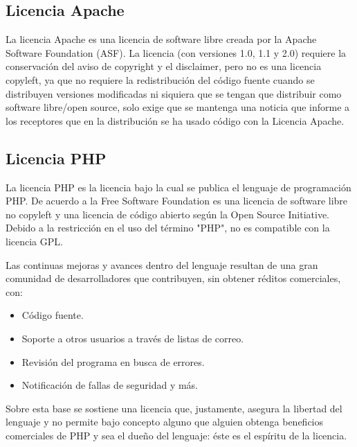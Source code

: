 			\subsection{Licencia Apache}\label{apsl}
			
				La licencia Apache es una licencia de software libre creada por la Apache Software Foundation (ASF). La licencia (con versiones 1.0, 1.1 y 2.0) requiere la conservación del aviso de copyright y el disclaimer, pero no es una licencia copyleft, ya que no requiere la redistribución del código fuente cuando se distribuyen versiones modificadas ni siquiera que se tengan que distribuir como software libre/open source, solo exige que se mantenga una noticia que informe a los receptores que en la distribución se ha usado código con la Licencia Apache.\par
				
			\subsection{Licencia PHP}
			
				La licencia PHP es la licencia bajo la cual se publica el lenguaje de programación PHP. De acuerdo a la Free Software Foundation es una licencia de software libre no copyleft y una licencia de código abierto según la Open Source Initiative. Debido a la restricción en el uso del término "PHP", no es compatible con la licencia GPL.
				
				Las continuas mejoras y avances dentro del lenguaje resultan de una gran comunidad de desarrolladores que contribuyen, sin obtener réditos comerciales, con:
				
				\begin{itemize}
					
					\item Código fuente.
					\item Soporte a otros usuarios a través de listas de correo.
					\item Revisión del programa en busca de errores.
					\item Notificación de fallas de seguridad y más.
				
				\end{itemize}
			
				Sobre esta base se sostiene una licencia que, justamente, asegura la libertad del lenguaje y no permite bajo concepto alguno que alguien obtenga beneficios comerciales de PHP y sea el dueño del lenguaje: éste es el espíritu de la licencia.\par
				
